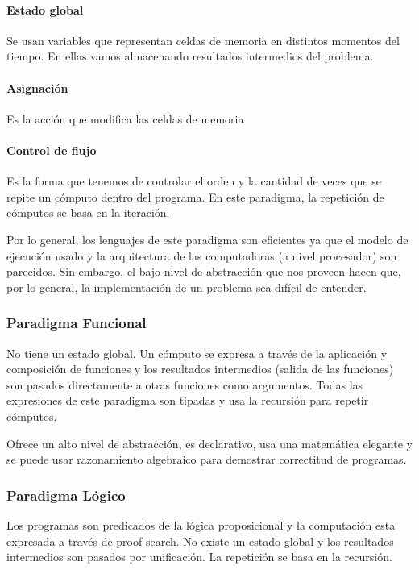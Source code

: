 \paragraph{Estado global} Se usan variables que representan celdas de memoria en distintos momentos del tiempo. En ellas vamos almacenando resultados intermedios del problema.

\paragraph{Asignación} Es la acción que modifica las celdas de memoria

\paragraph{Control de flujo} Es la forma que tenemos de controlar el orden y la cantidad de veces que se repite un cómputo dentro del programa. En este paradigma, la repetición de cómputos se basa en la iteración.

\vspace*{5mm}

Por lo general, los lenguajes de este paradigma son eficientes ya que el modelo de ejecución usado y la arquitectura de las computadoras (a nivel procesador) son parecidos. Sin embargo, el bajo nivel de abstracción que nos proveen hacen que, por lo general, la implementación de un problema sea difícil de entender.

\subsubsection{Paradigma Funcional}
No tiene un estado global. Un cómputo se expresa a través de la aplicación y composición de funciones y los resultados intermedios (salida de las funciones) son pasados directamente a otras funciones como argumentos. Todas las expresiones de este paradigma son tipadas y usa la recursión para repetir cómputos.

Ofrece un alto nivel de abstracción, es declarativo, usa una matemática elegante y se puede usar razonamiento algebraico para demostrar correctitud de programas.

\subsubsection{Paradigma Lógico}
Los programas son predicados de la lógica proposicional y la computación esta expresada a través de proof search. No existe un estado global y los resultados intermedios son pasados por unificación. La repetición se basa en la recursión.

